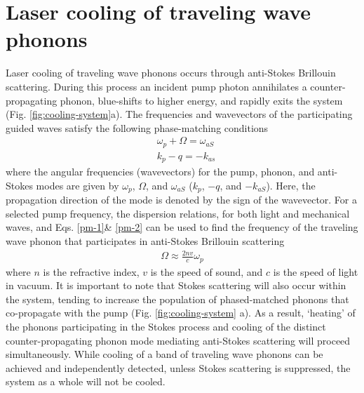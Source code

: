 \section{Laser cooling of traveling wave phonons}
Laser cooling of traveling wave phonons occurs through anti-Stokes Brillouin scattering. During this process an incident pump photon annihilates a counter-propagating phonon, blue-shifts to higher energy, and rapidly exits the system (Fig. \ref{fig:cooling-system}a).
%
The frequencies and wavevectors of the participating guided waves satisfy the following phase-matching conditions
\begin{align}
\label{pm-1}
    &\omega_p + \Omega = \omega_{aS} \\
    \label{pm-2}
    &k_p - q = -k_{as}
\end{align}
where the angular frequencies (wavevectors) for the pump, phonon, and anti-Stokes modes are given by $\omega_p$, $\Omega$, and $\omega_{aS}$ ($k_p$, $-q$, and $-k_{aS}$). Here, the propagation direction of the mode is denoted by the sign of the wavevector. For a selected pump frequency, the dispersion relations, for both light and mechanical waves, and Eqs. \eqref{pm-1}\& \eqref{pm-2} can be used to find the frequency of the traveling wave phonon that participates in anti-Stokes Brillouin scattering
\begin{align}
\label{pm-3}
    \Omega \approx \frac{2 n v}{c}\omega_p
\end{align}
where $n$ is the refractive index, $v$ is the speed of sound, and $c$ is the speed of light in vacuum. It is important to note that Stokes scattering will also occur within the system, tending to increase the population of phased-matched phonons that co-propagate with the pump (Fig. \ref{fig:cooling-system} a). As a result, `heating' of the phonons participating in the Stokes process and cooling of the distinct counter-propagating phonon mode mediating anti-Stokes scattering will proceed simultaneously. While cooling of a band of traveling wave phonons can be achieved and independently detected, unless Stokes scattering is suppressed, the system as a whole will not be cooled.

